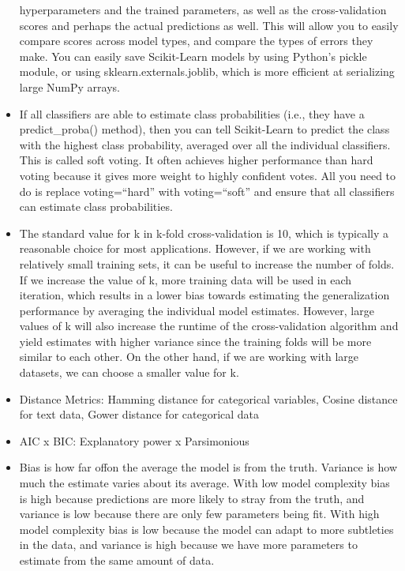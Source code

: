 \documentclass[]{book}
\theoremstyle{definition}
\theoremstyle{definition}
\theoremstyle{definition}
\theoremstyle{remark}
\begin{document}
\begin{itemize}
  hyperparameters and the trained parameters, as well as the
  cross-validation scores and perhaps the actual predictions as well.
  This will allow you to easily compare scores across model types, and
  compare the types of errors they make. You can easily save
  Scikit-Learn models by using Python's pickle module, or using
  sklearn.externals.joblib, which is more efficient at serializing large
  NumPy arrays.
\item
  If all classifiers are able to estimate class probabilities (i.e.,
  they have a predict\_proba() method), then you can tell Scikit-Learn
  to predict the class with the highest class probability, averaged over
  all the individual classifiers. This is called soft voting. It often
  achieves higher performance than hard voting because it gives more
  weight to highly confident votes. All you need to do is replace
  voting=``hard'' with voting=``soft'' and ensure that all classifiers
  can estimate class probabilities.
\item
  The standard value for k in k-fold cross-validation is 10, which is
  typically a reasonable choice for most applications. However, if we
  are working with relatively small training sets, it can be useful to
  increase the number of folds. If we increase the value of k, more
  training data will be used in each iteration, which results in a lower
  bias towards estimating the generalization performance by averaging
  the individual model estimates. However, large values of k will also
  increase the runtime of the cross-validation algorithm and yield
  estimates with higher variance since the training folds will be more
  similar to each other. On the other hand, if we are working with large
  datasets, we can choose a smaller value for k.
\item
  Distance Metrics: Hamming distance for categorical variables, Cosine
  distance for text data, Gower distance for categorical data
\item
  AIC x BIC: Explanatory power x Parsimonious
\item
  Bias is how far offon the average the model is from the truth.
  Variance is how much the estimate varies about its average. With low
  model complexity bias is high because predictions are more likely to
  stray from the truth, and variance is low because there are only few
  parameters being fit. With high model complexity bias is low because
  the model can adapt to more subtleties in the data, and variance is
  high because we have more parameters to estimate from the same amount
  of data.

\end{itemize}
\end{document}
